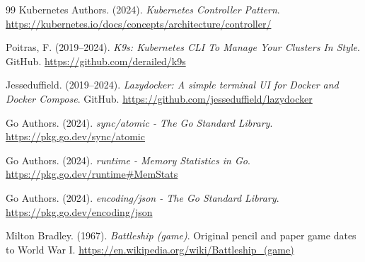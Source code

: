 \documentclass[11pt]{article}
\begin{document}
\begin{thebibliography}{99}
Kubernetes Authors. (2024). \textit{Kubernetes Controller Pattern}.
\url{https://kubernetes.io/docs/concepts/architecture/controller/}




Poitras, F. (2019--2024). \textit{K9s: Kubernetes CLI To Manage Your Clusters In Style}.
GitHub. \url{https://github.com/derailed/k9s}

Jesseduffield. (2019--2024). \textit{Lazydocker: A simple terminal UI for Docker and Docker Compose}.
GitHub. \url{https://github.com/jesseduffield/lazydocker}




Go Authors. (2024). \textit{sync/atomic - The Go Standard Library}.
\url{https://pkg.go.dev/sync/atomic}

Go Authors. (2024). \textit{runtime - Memory Statistics in Go}.
\url{https://pkg.go.dev/runtime#MemStats}

Go Authors. (2024). \textit{encoding/json - The Go Standard Library}.
\url{https://pkg.go.dev/encoding/json}




Milton Bradley. (1967). \textit{Battleship (game)}.
Original pencil and paper game dates to World War I.
\url{https://en.wikipedia.org/wiki/Battleship_(game)}

\end{thebibliography}
\end{document}
